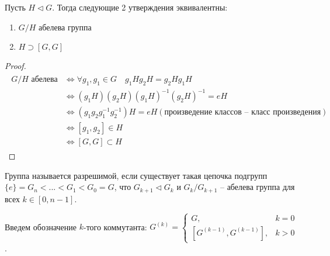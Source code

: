 \begin{theorem-non}
    Пусть $H \lhd G$. 
    Тогда следующие 2 утверждения эквивалентны: 
    \begin{enumerate}
        \item $G / H$ абелева группа
        \item $H \supset [G, G]$
    \end{enumerate}
\end{theorem-non}
\begin{proof} \quad \\
    \begin{gather*}
        \begin{split}
            \text{$G / H$ абелева} 
            &\Leftrightarrow \forall g_1, g_1 \in G \quad g_1Hg_2H = g_2Hg_1H \\
            &\Leftrightarrow (g_1H)(g_2H)(g_1H)^{-1}(g_2H)^{-1} = eH  \\
            &\Leftrightarrow (g_1g_2g_1^{-1}g_2^{-1})H = eH (\text{произведение классов -- класс произведения})\\
            &\Leftrightarrow [g_1, g_2] \in H \\
            &\Leftrightarrow [G, G] \subset H
        \end{split}
    \end{gather*}
\end{proof}

\begin{conj}
    Группа называется разрешимой, если существует такая цепочка подгрупп \\ $\{e\} = G_n < ... < G_1 < G_0 = G$, что $G_{k + 1} \lhd G_k$ и $G_k / G_{k + 1}$ -- абелева группа для всех $k \in [0, n - 1]$.
\end{conj}
Введем обозначение $k$-того коммутанта: 
$G^{(k)} = \begin{cases}
    G, & k = 0 \\
    [G^{(k - 1)}, G^{(k - 1)}], & k > 0
 \end{cases}$.
 
